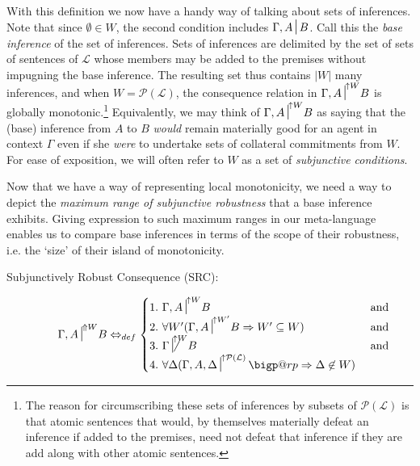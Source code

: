 \documentclass{article}
\makeatletter
\newcommand{\nc}{\turnstile{s}{w}{}{}{n}}
\newcommand{\bigperp}{%
  \mathop{\mathpalette\bigp@rp\relax}%
  \displaylimits
}
\newcommand{\bigp@rp}[2]{%
  \vcenter{
    \m@th\hbox{\scalebox{\ifx#1\displaystyle2.1\else1.5\fi}{$#1\perp$}}
  }%
}
\makeatother
\begin{document}
With this definition we now have a handy way of talking about sets of inferences. Note that since $ \emptyset \in W $, the second condition includes $ \Gamma, A \nc B $. Call this the \textit{base inference} of the set of inferences. Sets of inferences are delimited by the set of sets of sentences of $ \mathcal{L} $ whose members may be added to the premises without impugning the base inference. The resulting set thus contains $ |W| $ many inferences,  and when $ W = \mathcal{P}(\mathcal{L}) $, the consequence relation in $ {\Gamma, A \nc}^{\uparrow W} B $ is globally monotonic.\footnote{The reason for circumscribing these sets of inferences by subsets of $ \mathcal{P}(\mathcal{L}) $ is that atomic sentences that would, by themselves materially defeat an inference if added to the premises, need not defeat that inference if they are add along with other atomic sentences.} Equivalently, we may think of $ {\Gamma, A \nc}^{\uparrow W} B $ as saying that the (base) inference from $ A $ to $ B $ \textit{would} remain materially good for an agent in context $ \Gamma $ even if she \textit{were} to undertake sets of collateral commitments from $ W $. For ease of exposition, we will often refer to $W$ as a set of \textit{subjunctive conditions}.

Now that we have a way of representing local monotonicity, we need a way to depict the \textit{maximum range of subjunctive robustness} that a base inference exhibits. Giving expression to such maximum ranges in our meta-language enables us to compare base inferences in terms of the scope of their robustness, i.e. the `size' of their island of monotonicity.

	\begin{description}
		\item[Subjunctively Robust Consequence (SRC):]
		  \begin{equation}
		      {\Gamma, A \nc}^{\Uparrow W}B \Leftrightarrow_{def} 
		      \begin{cases}\nonumber
		        1.\,\, {\Gamma, A \nc}^{\uparrow W} B & $ and $ \\
				2.\,\, \forall W'({\Gamma, A \nc}^{\uparrow W'}B \Rightarrow W' \subseteq W)  & $ and $\\ 
				3.\,\, {\Gamma \not\nc}^{\uparrow W} B & $ and $\\ 
		        4.\,\, \forall\Delta({\Gamma, A, \Delta \nc}^{\uparrow \mathcal{P}(\mathcal{L})} \bigperp \Rightarrow \Delta \not\in W)

				\end{cases}
		  \end{equation}

	\end{description}
\end{document}
